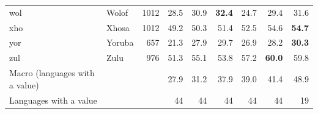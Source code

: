 {\begin{longtable}{@{}llrrrrrrr@{}}
wol & Wolof & 1012 & 28.5 & 30.9 & \textbf{32.4} & 24.7 & 29.4 & 31.6 \\
xho & Xhosa & 1012 & 49.2 & 50.3 & 51.4 & 52.5 & 54.6 & \textbf{54.7} \\
yor & Yoruba & 657 & 21.3 & 27.9 & 29.7 & 26.9 & 28.2 & \textbf{30.3} \\
zul & Zulu & 976 & 51.3 & 55.1 & 53.8 & 57.2 & \textbf{60.0} & 59.8 \\
\midrule
Macro (languages with a value) & & & 27.9 & 31.2 & 37.9 & 39.0 & 41.4 & 48.9 \\
Languages with a value & & & 44 & 44 & 44 & 44 & 44 & 19 \\
\end{longtable}}

